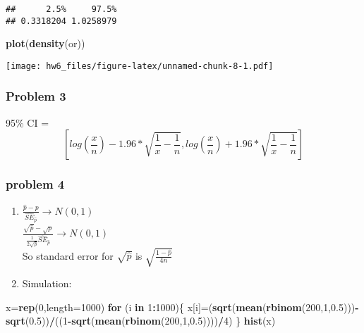\documentclass[]{article}
\newenvironment{Shaded}{\begin{snugshade}}{\end{snugshade}}
\newcommand{\KeywordTok}[1]{\textcolor[rgb]{0.13,0.29,0.53}{\textbf{#1}}}
\newcommand{\DataTypeTok}[1]{\textcolor[rgb]{0.13,0.29,0.53}{#1}}
\newcommand{\DecValTok}[1]{\textcolor[rgb]{0.00,0.00,0.81}{#1}}
\newcommand{\FloatTok}[1]{\textcolor[rgb]{0.00,0.00,0.81}{#1}}
\newcommand{\ControlFlowTok}[1]{\textcolor[rgb]{0.13,0.29,0.53}{\textbf{#1}}}
\newcommand{\OperatorTok}[1]{\textcolor[rgb]{0.81,0.36,0.00}{\textbf{#1}}}
\newcommand{\NormalTok}[1]{#1}
\providecommand{\tightlist}{%
  \setlength{\itemsep}{0pt}\setlength{\parskip}{0pt}}
\begin{document}
\begin{verbatim}
##      2.5%     97.5% 
## 0.3318204 1.0258979
\end{verbatim}

\begin{Shaded}
\begin{Highlighting}[]
\KeywordTok{plot}\NormalTok{(}\KeywordTok{density}\NormalTok{(or))}
\end{Highlighting}
\end{Shaded}

\texttt{[image: hw6\_files/figure-latex/unnamed-chunk-8-1.pdf]}

\subsubsection{Problem 3}\label{problem-3}

95\% CI =\\
\[[log(\frac{x}{n})-1.96*\sqrt{\frac{1}{x}-\frac{1}{n}},log(\frac{x}{n})+1.96*\sqrt{\frac{1}{x}-\frac{1}{n}}]\]

\subsubsection{problem 4}\label{problem-4}

\begin{enumerate}
\def\labelenumi{\alph{enumi}.}
\tightlist
\item
  \({\frac{\hat{p}-p}{\hat{SE}_\hat{p}}}\to N(0,1)\)\\
  \({\frac{\sqrt{\hat{p}}-\sqrt{p}}{\frac{1}{2\sqrt{\hat{p}}}\hat{SE}_\hat{p}} }\to N(0,1)\)\\
  So standard error for \(\sqrt{\hat{p}}\) is
  \(\sqrt{\frac{1-\hat{p}}{4n}}\)\\
\item
  Simulation:
\end{enumerate}

\begin{Shaded}
\begin{Highlighting}[]
\NormalTok{x=}\KeywordTok{rep}\NormalTok{(}\DecValTok{0}\NormalTok{,}\DataTypeTok{length=}\DecValTok{1000}\NormalTok{)}
\ControlFlowTok{for}\NormalTok{ (i }\ControlFlowTok{in} \DecValTok{1}\OperatorTok{:}\DecValTok{1000}\NormalTok{)\{}
\NormalTok{x[i]=(}\KeywordTok{sqrt}\NormalTok{(}\KeywordTok{mean}\NormalTok{(}\KeywordTok{rbinom}\NormalTok{(}\DecValTok{200}\NormalTok{,}\DecValTok{1}\NormalTok{,}\FloatTok{0.5}\NormalTok{)))}\OperatorTok{-}\KeywordTok{sqrt}\NormalTok{(}\FloatTok{0.5}\NormalTok{))}\OperatorTok{/}\NormalTok{((}\DecValTok{1}\OperatorTok{-}\KeywordTok{sqrt}\NormalTok{(}\KeywordTok{mean}\NormalTok{(}\KeywordTok{rbinom}\NormalTok{(}\DecValTok{200}\NormalTok{,}\DecValTok{1}\NormalTok{,}\FloatTok{0.5}\NormalTok{))))}\OperatorTok{/}\DecValTok{4}\NormalTok{)}
\NormalTok{\}}
\KeywordTok{hist}\NormalTok{(x)}
\end{Highlighting}
\end{Shaded}
\end{document}
